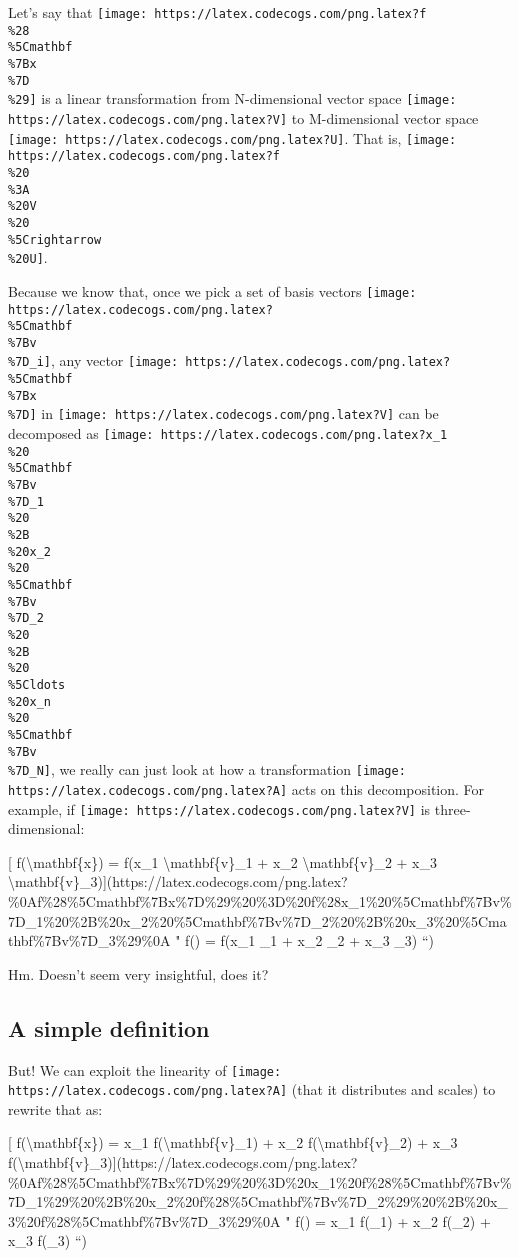 \documentclass[]{article}
\begin{document}
Let's say that
\texttt{[image: https://latex.codecogs.com/png.latex?f\\\%28\\\%5Cmathbf\\\%7Bx\\\%7D\\\%29]}
is a linear transformation from N-dimensional vector space
\texttt{[image: https://latex.codecogs.com/png.latex?V]} to M-dimensional vector
space \texttt{[image: https://latex.codecogs.com/png.latex?U]}. That is,
\texttt{[image: https://latex.codecogs.com/png.latex?f\\\%20\\\%3A\\\%20V\\\%20\\\%5Crightarrow\\\%20U]}.

Because we know that, once we pick a set of basis vectors
\texttt{[image: https://latex.codecogs.com/png.latex?\\\%5Cmathbf\\\%7Bv\\\%7D\_i]},
any vector
\texttt{[image: https://latex.codecogs.com/png.latex?\\\%5Cmathbf\\\%7Bx\\\%7D]} in
\texttt{[image: https://latex.codecogs.com/png.latex?V]} can be decomposed as
\texttt{[image: https://latex.codecogs.com/png.latex?x\_1\\\%20\\\%5Cmathbf\\\%7Bv\\\%7D\_1\\\%20\\\%2B\\\%20x\_2\\\%20\\\%5Cmathbf\\\%7Bv\\\%7D\_2\\\%20\\\%2B\\\%20\\\%5Cldots\\\%20x\_n\\\%20\\\%5Cmathbf\\\%7Bv\\\%7D\_N]},
we really can just look at how a transformation
\texttt{[image: https://latex.codecogs.com/png.latex?A]} acts on this
decomposition. For example, if
\texttt{[image: https://latex.codecogs.com/png.latex?V]} is three-dimensional:

{[} f(\textbackslash{}mathbf\{x\}) = f(x\_1 \textbackslash{}mathbf\{v\}\_1 +
x\_2 \textbackslash{}mathbf\{v\}\_2 + x\_3
\textbackslash{}mathbf\{v\}\_3){]}(https://latex.codecogs.com/png.latex?\%0Af\%28\%5Cmathbf\%7Bx\%7D\%29\%20\%3D\%20f\%28x\_1\%20\%5Cmathbf\%7Bv\%7D\_1\%20\%2B\%20x\_2\%20\%5Cmathbf\%7Bv\%7D\_2\%20\%2B\%20x\_3\%20\%5Cmathbf\%7Bv\%7D\_3\%29\%0A
" f() = f(x\_1 \_1 + x\_2 \_2 + x\_3
\_3) ``)

Hm. Doesn't seem very insightful, does it?

\hypertarget{a-simple-definition}{%
\subsection{A simple definition}\label{a-simple-definition}}

But! We can exploit the linearity of
\texttt{[image: https://latex.codecogs.com/png.latex?A]} (that it distributes
and scales) to rewrite that as:

{[} f(\textbackslash{}mathbf\{x\}) = x\_1 f(\textbackslash{}mathbf\{v\}\_1) +
x\_2 f(\textbackslash{}mathbf\{v\}\_2) + x\_3
f(\textbackslash{}mathbf\{v\}\_3){]}(https://latex.codecogs.com/png.latex?\%0Af\%28\%5Cmathbf\%7Bx\%7D\%29\%20\%3D\%20x\_1\%20f\%28\%5Cmathbf\%7Bv\%7D\_1\%29\%20\%2B\%20x\_2\%20f\%28\%5Cmathbf\%7Bv\%7D\_2\%29\%20\%2B\%20x\_3\%20f\%28\%5Cmathbf\%7Bv\%7D\_3\%29\%0A
" f() = x\_1 f(\_1) + x\_2 f(\_2) + x\_3
f(\_3) ``)
\end{document}

